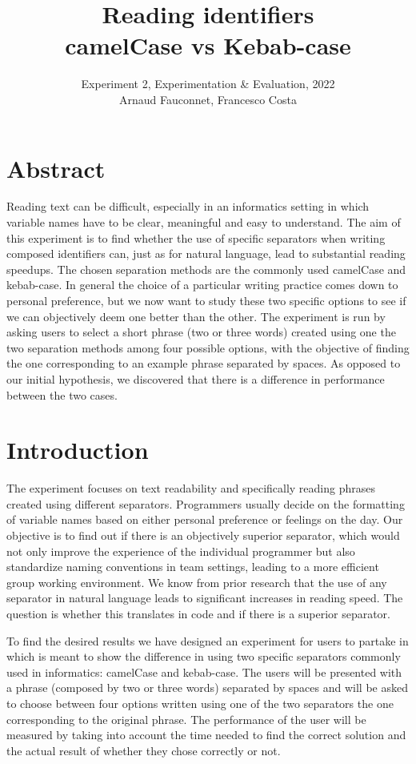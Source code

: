 \documentclass{article}
\title{Reading identifiers \\ camelCase vs Kebab-case}
\author{Experiment 2, Experimentation \& Evaluation, 2022\\Arnaud Fauconnet,
	Francesco Costa}
\date{}
\begin{document}
\maketitle
\tableofcontents

\section*{Abstract}
Reading text can be difficult, especially in an informatics setting in which variable names have to be clear, meaningful and 
easy to understand. The aim of this experiment is to find whether the use of specific separators when writing composed identifiers 
can, just as for natural language, lead to substantial reading speedups. The chosen separation methods are the commonly used camelCase and 
kebab-case. In general the choice of a particular writing practice comes down to personal preference, but we now want to study these two 
specific options to see if we can objectively deem one better than the other. The experiment is run by asking users to select a short phrase (two or three words) 
created using one the two separation methods among four possible options, with the objective of finding the one corresponding to an example phrase 
separated by spaces. As opposed to our initial hypothesis, we discovered that there is a difference in performance between the two cases.

\newpage 
\section{Introduction}
The experiment focuses on text readability and specifically reading phrases created using different separators. Programmers usually decide on the formatting of 
variable names based on either personal preference or feelings on the day. Our objective is to find out if there is an objectively superior separator, which would 
not only improve the experience of the individual programmer but also standardize naming conventions in team settings, leading to a more 
efficient group working environment.
We know from prior research that the use of any separator in natural language leads to significant increases in reading speed. The question is whether this translates in 
code and if there is a superior separator. 

To find the desired results we have designed an experiment for users to partake in which is meant to show the difference in using two specific separators commonly 
used in informatics: camelCase and kebab-case. The users will be presented with a phrase (composed by two or three words) separated by spaces and will be asked to choose between four options 
written using one of the two separators the one corresponding to the original phrase. The performance of the user will be measured by taking into account the time needed to 
find the correct solution and the actual result of whether they chose correctly or not.
\end{document}

